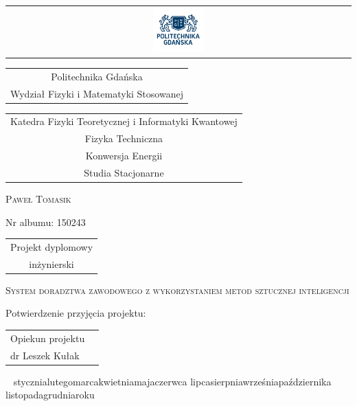 \documentclass[12pt,a4paper,oneside]{report} %
\def\PLdateending{\space roku}
\def\today{\number\day~\ifcase\month\or
           stycznia\or lutego\or marca\or kwietnia\or maja\or czerwca\or
           lipca\or sierpnia\or wrze\'snia\or pa\'zdziernika\or
           listopada\or grudnia\fi \space\number\year \PLdateending}
\begin{document}
\begin{titlepage}

\centering
\begin{tabular}{c}
\includegraphics[width=0.15\textwidth]{pg-logo.png}
\end{tabular}
\begin{tabular}{c}
Politechnika Gdańska \\
Wydział Fizyki i Matematyki Stosowanej
\end{tabular}
\par\vspace{1cm}

\begin{tabular}{c}
{\large Katedra Fizyki Teoretycznej i  Informatyki Kwantowej}\\
Fizyka Techniczna\\
Konwersja Energii\\
Studia Stacjonarne\\
\end{tabular}
\par\vspace{1cm}


{\scshape\LARGE Paweł Tomasik \par}
Nr albumu: 150243\par
\par\vspace{1cm}


\begin{tabular}{c}
{\small Projekt dyplomowy} \\

{\small inżynierski} \\
\end{tabular}
\par\vspace{1cm}


{\Large\scshape System doradztwa zawodowego z wykorzystaniem metod sztucznej inteligencji\par}
\vfill
Potwierdzenie przyjęcia projektu: \par
\vspace{1cm}
\begin{tabular}{ll}
Opiekun projektu & \hspace{5cm}  \\
dr Leszek Kułak &  \\
\end{tabular}
\par
\vspace{1cm}
\today

\end{titlepage}
\end{document}
